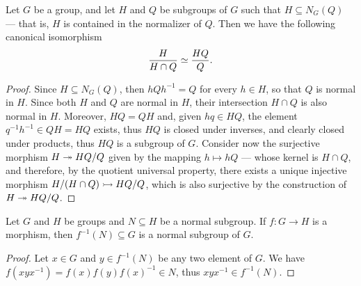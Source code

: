 \begin{corollary}
    \label{cor:grp-intersection-coset-isomorphism}
    Let \(G\) be a group, and let \(H\) and \(Q\) be subgroups of \(G\) such that
    \(H \subseteq N_G(Q)\) --- that is, \(H\) is contained in the normalizer of
    \(Q\). Then we have the following canonical isomorphism
    \[
        \frac{H}{H \cap Q} \simeq \frac{H Q}{Q}.
    \]
\end{corollary}

\begin{proof}
    Since \(H \subseteq N_G(Q)\), then \(hQh^{-1} = Q\) for every \(h \in H\), so
    that \(Q\) is normal in \(H\). Since both \(H\) and \(Q\) are normal in \(H\),
    their intersection \(H \cap Q\) is also normal in \(H\). Moreover, \(HQ = QH\)
    and, given \(hq \in HQ\), the element \(q^{-1} h^{-1} \in Q H = H Q\) exists, thus
    \(HQ\) is closed under inverses, and clearly closed under products, thus \(HQ\)
    is a subgroup of \(G\). Consider now the surjective morphism \(H \twoheadrightarrow H Q / Q\)
    given by the mapping \(h \mapsto h Q\) --- whose kernel is \(H \cap Q\), and
    therefore, by the quotient universal property, there exists a unique injective
    morphism \(H/(H \cap Q) \rightarrowtail HQ/Q\), which is also surjective by the
    construction of \(H \twoheadrightarrow H Q / Q\).
\end{proof}

\begin{proposition}
    \label{prop:morphisms-preserve-normality}
    Let \(G\) and \(H\) be groups and \(N \subseteq H\) be a normal subgroup. If
    \(f: G \to H\) is a morphism, then \(f^{-1}(N) \subseteq G\) is a normal
    subgroup of \(G\).
\end{proposition}

\begin{proof}
    Let \(x \in G\) and \(y \in f^{-1}(N)\) be any two element of \(G\). We have
    \(f(x y x^{-1}) = f(x) f(y) f(x)^{-1} \in N\), thus \(x y x^{-1} \in f^{-1}(N)\).
\end{proof}

